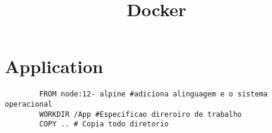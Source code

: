 \documentclass{article}
\date{} %
\title{Docker}
\begin{document}
    \maketitle
    \section{Application}
    \begin{lstlisting}
        FROM node:12- alpine #adiciona alinguagem e o sistema operacional 
        WORKDIR /App #Especificao direroiro de trabalho
        COPY .. # Copia todo diretorio


    \end{lstlisting}
    

    
\end{document}
